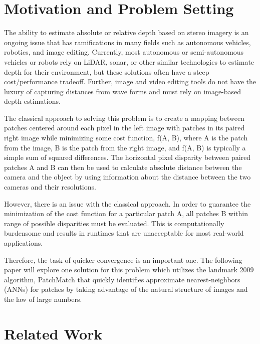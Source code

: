 \documentclass{article}
\begin{document}

\section{Motivation and Problem Setting}
The ability to estimate absolute or relative depth based on stereo imagery is an ongoing issue that has ramifications in many fields such as autonomous vehicles, robotics, and image editing. Currently, most autonomous or semi-autonomous vehicles or robots rely on LiDAR, sonar, or other similar technologies to estimate depth for their environment, but these solutions often have a steep cost/performance tradeoff. Further, image and video editing tools do not have the luxury of capturing distances from wave forms and must rely on image-based depth estimations.

The classical approach to solving this problem is to create a mapping between patches centered around each pixel in the left image with patches in its paired right image while minimizing some cost function, f(A, B), where A is the patch from the image, B is the patch from the right image, and f(A, B) is typically a simple sum of squared differences. The horizontal pixel disparity between paired patches A and B can then be used to calculate absolute distance between the camera and the object by using information about the distance between the two cameras and their resolutions.

However, there is an issue with the classical approach. In order to guarantee the minimization of the cost function for a particular patch A, all patches B within range of possible disparities must be evaluated. This is computationally burdensome and results in runtimes that are unacceptable for most real-world applications.

Therefore, the task of quicker convergence is an important one. The following paper will explore one solution for this problem which utilizes the landmark 2009 algorithm, PatchMatch \citep{barnes2009patchmatch} that quickly identifies approximate nearest-neighbors (ANNs) for patches by taking advantage of the natural structure of images and the law of large numbers.

\section{Related Work}
\end{document}
